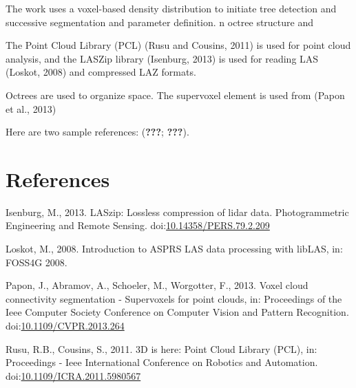 \documentclass[]{elsarticle} %
\begin{document}
The work uses a voxel-based density distribution to initiate tree
detection and successive segmentation and parameter definition. n octree
structure and

The Point Cloud Library (PCL) (Rusu and Cousins, 2011) is used for point
cloud analysis, and the LASZip library (Isenburg, 2013) is used for
reading LAS (Loskot, 2008) and compressed LAZ formats.

Octrees are used to organize space. The supervoxel element is used from
(Papon et al., 2013)

Here are two sample references: ({\textbf{???}}; {\textbf{???}}).

\hypertarget{references}{%
\section*{References}\label{references}}

\hypertarget{refs}{}
\leavevmode\hypertarget{ref-Isenburg2013}{}%
Isenburg, M., 2013. LASzip: Lossless compression of lidar data.
Photogrammetric Engineering and Remote Sensing.
doi:\href{https://doi.org/10.14358/PERS.79.2.209}{10.14358/PERS.79.2.209}

\leavevmode\hypertarget{ref-Loskot2008}{}%
Loskot, M., 2008. Introduction to ASPRS LAS data processing with libLAS,
in: FOSS4G 2008.

\leavevmode\hypertarget{ref-Papon2013}{}%
Papon, J., Abramov, A., Schoeler, M., Worgotter, F., 2013. Voxel cloud
connectivity segmentation - Supervoxels for point clouds, in:
Proceedings of the Ieee Computer Society Conference on Computer Vision
and Pattern Recognition.
doi:\href{https://doi.org/10.1109/CVPR.2013.264}{10.1109/CVPR.2013.264}

\leavevmode\hypertarget{ref-Rusu2011}{}%
Rusu, R.B., Cousins, S., 2011. 3D is here: Point Cloud Library (PCL),
in: Proceedings - Ieee International Conference on Robotics and
Automation.
doi:\href{https://doi.org/10.1109/ICRA.2011.5980567}{10.1109/ICRA.2011.5980567}
\end{document}
